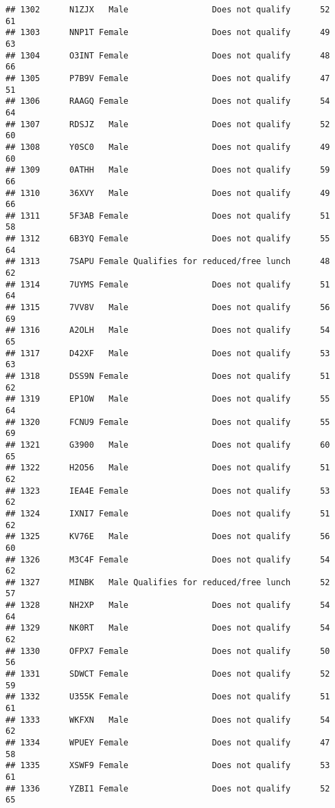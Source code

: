 \documentclass[
]{article}
\begin{document}
\begin{verbatim}
## 1302      N1ZJX   Male                 Does not qualify      52       61
## 1303      NNP1T Female                 Does not qualify      49       63
## 1304      O3INT Female                 Does not qualify      48       66
## 1305      P7B9V Female                 Does not qualify      47       51
## 1306      RAAGQ Female                 Does not qualify      54       64
## 1307      RDSJZ   Male                 Does not qualify      52       60
## 1308      Y0SC0   Male                 Does not qualify      49       60
## 1309      0ATHH   Male                 Does not qualify      59       66
## 1310      36XVY   Male                 Does not qualify      49       66
## 1311      5F3AB Female                 Does not qualify      51       58
## 1312      6B3YQ Female                 Does not qualify      55       64
## 1313      7SAPU Female Qualifies for reduced/free lunch      48       62
## 1314      7UYMS Female                 Does not qualify      51       64
## 1315      7VV8V   Male                 Does not qualify      56       69
## 1316      A2OLH   Male                 Does not qualify      54       65
## 1317      D42XF   Male                 Does not qualify      53       63
## 1318      DSS9N Female                 Does not qualify      51       62
## 1319      EP1OW   Male                 Does not qualify      55       64
## 1320      FCNU9 Female                 Does not qualify      55       69
## 1321      G3900   Male                 Does not qualify      60       65
## 1322      H2O56   Male                 Does not qualify      51       62
## 1323      IEA4E Female                 Does not qualify      53       62
## 1324      IXNI7 Female                 Does not qualify      51       62
## 1325      KV76E   Male                 Does not qualify      56       60
## 1326      M3C4F Female                 Does not qualify      54       62
## 1327      MINBK   Male Qualifies for reduced/free lunch      52       57
## 1328      NH2XP   Male                 Does not qualify      54       64
## 1329      NK0RT   Male                 Does not qualify      54       62
## 1330      OFPX7 Female                 Does not qualify      50       56
## 1331      SDWCT Female                 Does not qualify      52       59
## 1332      U355K Female                 Does not qualify      51       61
## 1333      WKFXN   Male                 Does not qualify      54       62
## 1334      WPUEY Female                 Does not qualify      47       58
## 1335      XSWF9 Female                 Does not qualify      53       61
## 1336      YZBI1 Female                 Does not qualify      52       65

\end{verbatim}
\end{document}
